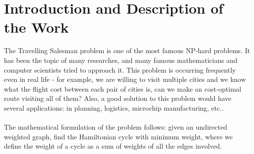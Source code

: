 \section*{Introduction and Description of the Work}

The Travelling Salesman problem is one of the most famous NP-hard problems. It has been the topic of many researches, and many famous mathematicians and computer scientists tried to approach it. This problem is occurring frequently even in real life - for example, we are willing to visit multiple cities and we know what the flight cost between each pair of cities is, can we make an cost-optimal route visiting all of them? Also, a good solution to this problem would have several applications: in planning, logistics, microchip manufacturing, etc.. \\ \\

The mathematical formulation of the problem follows: given an undirected weighted graph, find the Hamiltonian cycle with minimum weight, where we define the weight of a cycle as a sum of weights of all the edges involved. \\ \\

